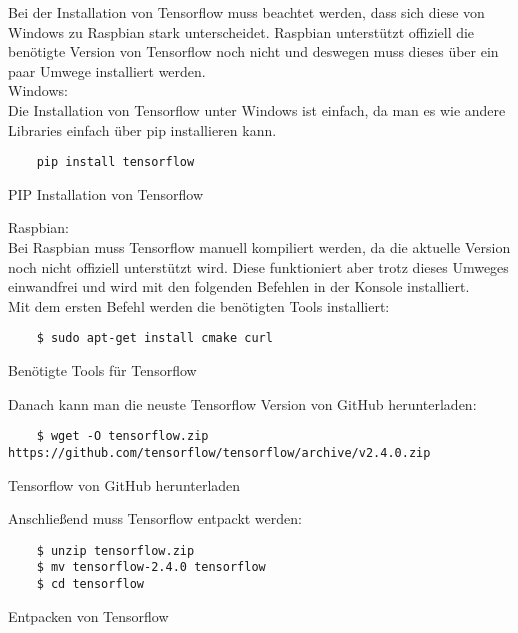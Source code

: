 Bei der Installation von Tensorflow muss beachtet werden, dass sich diese von Windows zu Raspbian stark unterscheidet. 
Raspbian unterstützt offiziell die benötigte Version von Tensorflow noch nicht und deswegen muss dieses über ein paar Umwege installiert werden.\\

Windows:\\

Die Installation von Tensorflow unter Windows ist einfach, da man es wie andere Libraries einfach über pip installieren kann.

\begin{listing}[H]
    \begin{verbatim}
    pip install tensorflow
    \end{verbatim}
    \caption{PIP Installation von Tensorflow}
\end{listing}

Raspbian:\\

Bei Raspbian muss Tensorflow manuell kompiliert werden, da die aktuelle Version noch nicht offiziell unterstützt wird. Diese funktioniert 
aber trotz dieses Umweges einwandfrei und wird mit den folgenden Befehlen in der Konsole installiert.\\

Mit dem ersten Befehl werden die benötigten Tools installiert:

\begin{listing}[H]
    \begin{verbatim}
    $ sudo apt-get install cmake curl
    \end{verbatim}
    \caption{Benötigte Tools für Tensorflow}
\end{listing}

Danach kann man die neuste Tensorflow Version von GitHub herunterladen:

\begin{listing}[H]
    \begin{verbatim}
    $ wget -O tensorflow.zip https://github.com/tensorflow/tensorflow/archive/v2.4.0.zip
    \end{verbatim}
    \caption{Tensorflow von GitHub herunterladen}
\end{listing}

Anschließend muss Tensorflow entpackt werden:

\begin{listing}[H]
    \begin{verbatim}
    $ unzip tensorflow.zip
    $ mv tensorflow-2.4.0 tensorflow
    $ cd tensorflow
    \end{verbatim}
    \caption{Entpacken von Tensorflow}
\end{listing}

